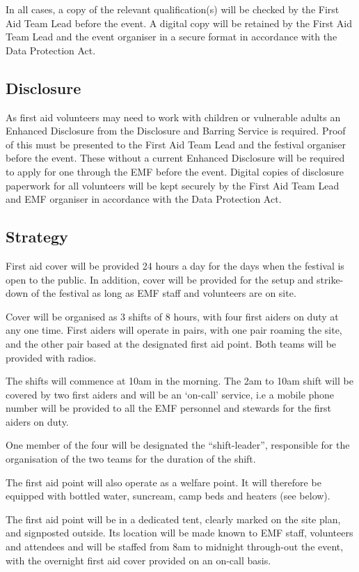In all cases, a copy of the relevant qualification(s) will be checked by the
First Aid Team Lead before the event. A digital copy will be retained by the
First Aid Team Lead and the event organiser in a secure format in accordance
with the Data Protection Act.

\subsection{Disclosure}
As first aid volunteers may need to work with children or vulnerable adults an
Enhanced Disclosure from the Disclosure and Barring Service is required. Proof
of this must be presented to the First Aid Team Lead and the festival organiser
before the event. These without a current Enhanced Disclosure will be required
to apply for one through the EMF  before the event. Digital copies of disclosure
paperwork for all volunteers will be kept securely by the First Aid Team Lead and
EMF organiser in accordance with the Data Protection Act.

\subsection{Strategy}
First aid cover will be provided 24 hours a day for the days when the festival
is open to the public. In addition, cover will be provided for the setup and
strike-down of the festival as long as EMF staff and volunteers are on site.

Cover will be organised as 3 shifts of 8 hours, with four first aiders on duty
at any one time. First aiders will operate in pairs, with one pair roaming the
site, and the other pair based at the designated first aid point. Both teams
will be provided with radios.

The shifts will commence at 10am in the morning. The 2am to 10am shift will
be covered by two first aiders and will be an `on-call’ service, i.e a mobile
phone number will be provided to all the EMF personnel and stewards for the
first aiders on duty.

One member of the four will be designated the ``shift-leader'', responsible for the organisation of the two teams for the duration of the shift.

The first aid point will also operate as a welfare point. It will therefore be equipped with bottled water, suncream, camp beds and heaters (see below).

The first aid point will be in a dedicated tent, clearly marked on the site plan, and signposted outside. Its location will be made known to EMF staff, volunteers and attendees and will be staffed from 8am to midnight through-out the event, with the overnight first aid cover provided on an on-call basis.

